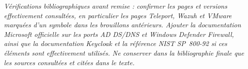 \documentclass[11pt,a4paper]{report}
\begin{document}
\textit{Vérifications bibliographiques avant remise : confirmer les pages et versions effectivement consultées, en particulier les pages Teleport, Wazuh et VMware marquées d'un symbole dans les brouillons antérieurs. Ajouter la documentation Microsoft officielle sur les ports AD DS/DNS et Windows Defender Firewall, ainsi que la documentation Keycloak et la référence NIST SP~800-92 si ces éléments sont effectivement utilisés. Ne conserver dans la bibliographie finale que les sources consultées et citées dans le texte.}
\normalsize

\end{document}
